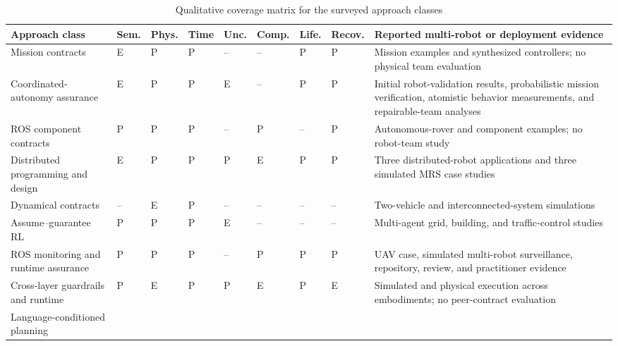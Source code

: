 \begin{table}[!h]
  \centering
  \caption{Qualitative coverage matrix for the surveyed approach classes}
  \label{tab:survey-matrix}
  \scriptsize
  \setlength{\tabcolsep}{2.4pt}
  \renewcommand{\arraystretch}{1.05}
  \begin{tabularx}{\textwidth}{@{}P{0.21\textwidth}*{7}{>{\centering\arraybackslash}P{0.047\textwidth}}Y@{}}
    \toprule
    Approach class & Sem. & Phys. & Time & Unc. & Comp. & Life. & Recov. & Reported multi-robot or deployment evidence \\
    \midrule
    Mission contracts \cite{mallozzi2020crome,mallozzi2023contextual,mallozzi2022repair}
      & E & P & P & -- & -- & P & P & Mission examples and synthesized controllers; no physical team evaluation \\
    Coordinated-autonomy assurance \cite{chaki2013assurance,chaki2013probabilistic,porter2013reliability,stancliff2006missionreliability}
      & E & P & P & E & -- & P & P & Initial robot-validation results, probabilistic mission verification, atomistic behavior measurements, and repairable-team analyses \\
    ROS component contracts \cite{luckcuck2026compositional}
      & P & P & P & -- & P & -- & P & Autonomous-rover and component examples; no robot-team study \\
    Distributed programming and design \cite{ghosh2020koord,harbin2023design}
      & E & P & P & P & E & P & P & Three distributed-robot applications and three simulated MRS case studies \\
    Dynamical contracts \cite{sharf2021dynamical,chen2019invariance,liu2022stlcontracts}
      & -- & E & P & -- & -- & -- & -- & Two-vehicle and interconnected-system simulations \\
    Assume--guarantee RL \cite{kazemi2024agrl}
      & P & P & P & E & -- & -- & -- & Multi-agent grid, building, and traffic-control studies \\
    ROS monitoring and runtime assurance \cite{ghaffari2024rosmonitoring,shivakumar2020soterros,caldas2024rvft,garg2024safecontrol}
      & P & P & P & -- & P & P & P & UAV case, simulated multi-robot surveillance, repository, review, and practitioner evidence \\
    Cross-layer guardrails and runtime \cite{kim2026guardrails,liu2026phyagentos}
      & P & E & P & P & E & P & E & Simulated and physical execution across embodiments; no peer-contract evaluation \\
    Language-conditioned planning \cite{mandi2023roco,obata2024lipllm}

\end{tabularx}
\end{table}
